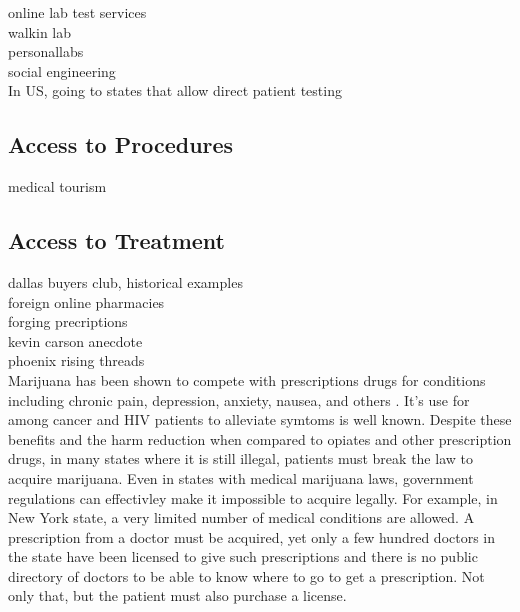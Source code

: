 \documentclass{article}
\begin{document}

online lab test services\\
walkin lab\\
personallabs\\
social engineering\\

In US, going to states that allow direct patient testing

\subsection{Access to Procedures}

medical tourism\\





\subsection{Access to Treatment}

dallas buyers club, historical examples\\
foreign online pharmacies\\
forging precriptions\\
kevin carson anecdote\\
phoenix rising threads\\

Marijuana has been shown to compete with prescriptions drugs for conditions including chronic pain, depression, anxiety, nausea, and others \cite{bradford2016medical}. It's use for among cancer and HIV patients to alleviate symtoms is well known. Despite these benefits and the harm reduction when compared to opiates and other prescription drugs, in many states where it is still illegal, patients must break the law to acquire marijuana. Even in states with medical marijuana laws, government regulations can effectivley make it impossible to acquire legally. For example, in New York state, a very limited number of medical conditions are allowed. A prescription from a doctor must be acquired, yet only a few hundred doctors in the state have been licensed to give such prescriptions and there is no public directory of doctors to be able to know where to go to get a prescription. Not only that, but the patient must also purchase a license. 
\end{document}
